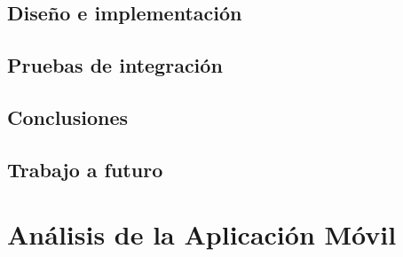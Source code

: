 \documentclass[12pt]{book}
\begin{document}


\chapter{Diseño e implementación}\label{chp:Implementacion}

\chapter{Pruebas de integración}

\chapter{Conclusiones}
\chapter{Trabajo a futuro}

\part{Análisis de la Aplicación Móvil}\label{part:analisisAplicacion}
\end{document}

